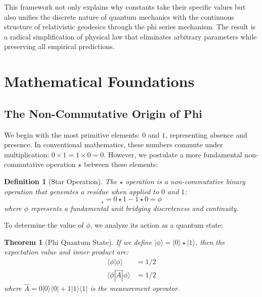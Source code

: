 \documentclass{article}
\newtheorem{theorem}{Theorem}
\newtheorem{definition}{Definition}
\begin{document}
This framework not only explains why constants take their specific values but also unifies the discrete nature of quantum mechanics with the continuous structure of relativistic geodesics through the phi series mechanism. The result is a radical simplification of physical law that eliminates arbitrary parameters while preserving all empirical predictions.

\section{Mathematical Foundations}

\subsection{The Non-Commutative Origin of Phi}

We begin with the most primitive elements: $0$ and $1$, representing absence and presence. In conventional mathematics, these numbers commute under multiplication: $0 \times 1 = 1 \times 0 = 0$. However, we postulate a more fundamental non-commutative operation $\star$ between these elements:

\begin{definition}[Star Operation]
The $\star$ operation is a non-commutative binary operation that generates a residue when applied to $0$ and $1$:
\begin{equation}
[0, 1]_\star = 0 \star 1 - 1 \star 0 = \phi
\end{equation}
where $\phi$ represents a fundamental unit bridging discreteness and continuity.
\end{definition}

To determine the value of $\phi$, we analyze its action as a quantum state:

\begin{theorem}[Phi Quantum State]
If we define $|\phi\rangle = |0\rangle \star |1\rangle$, then the expectation value and inner product are:
\begin{align}
\langle\phi|\phi\rangle &= 1/2\\
\langle\phi|\hat{A}|\phi\rangle &= 1/2
\end{align}
where $\hat{A} = 0|0\rangle\langle 0| + 1|1\rangle\langle 1|$ is the measurement operator.
\end{theorem}
\end{document}

